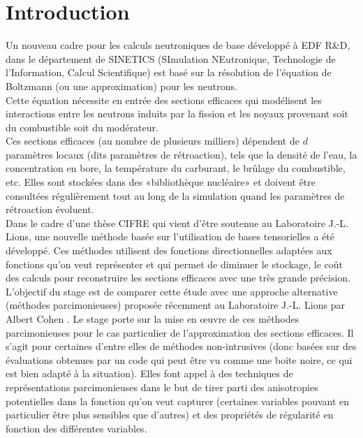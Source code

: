 \section{Introduction}\label{sec:1}
\hspace{0.5cm}
Un nouveau cadre pour les calculs neutroniques de base développé à EDF R\&D, dans
le département de SINETICS (SImulation NEutronique, Technologie de l'Information,
Calcul Scientifique) est basé sur la résolution de l'équation de Boltzmann
(ou une approximation) pour les neutrons.\\
Cette équation nécessite en entrée des sections efficaces qui modélisent les
interactions entre les neutrons induits par la fission et les noyaux provenant
soit du combustible soit du modérateur. \\

Ces sections efficaces (au nombre de plusieurs milliers) dépendent
de $d$ paramètres locaux (dits paramètres de rétroaction), tels que la densité de l'eau,
la concentration en bore, la température du carburant, le brûlage du combustible, etc.
Elles sont stockées dans des «bibliothèque nucléaire» et doivent être consultées
régulièrement tout au long de la simulation quand les paramètres de rétroaction évoluent. \\

Dans le cadre d’une thèse CIFRE \cite{These} qui vient d’être soutenue au
Laboratoire J.-L. Lions, une nouvelle méthode \cite{Luu} basée sur l’utilisation
de bases tensorielles a été développé. Ces méthodes utilisent des fonctions directionnelles
adaptées aux fonctions qu’on veut représenter et qui permet de diminuer le stockage, le coût
des calculs pour reconstruire les sections efficaces avec une très grande précision. \\

L'objectif du stage est de comparer cette étude avec une approche alternative (méthodes parcimonieuses)
proposée récemment au Laboratoire J.-L. Lions par Albert Cohen \cite{Albert}.
Le stage porte sur la mise en œuvre de ces méthodes parcimonieuses pour le cas particulier de l'approximation
des sections efficaces. Il s'agit pour certaines d'entre elles de méthodes non-intrusives (donc basées sur
des évaluations obtenues par un code qui peut être vu comme une boite noire,
ce qui est bien adapté à la situation). Elles font appel à des techniques de représentations parcimonieuses
dans le but de tirer parti des anisotropies potentielles dans la fonction qu'on veut capturer
(certaines variables pouvant en particulier être plus sensibles que d'autres) et des propriétés
de régularité en fonction des différentes variables.

